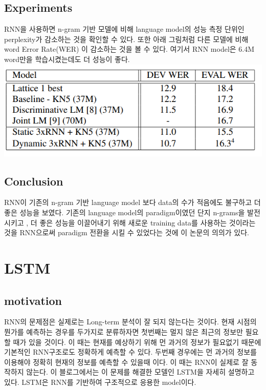 \documentclass[extendedabs]{bmvc2k}
\begin{document}
\subsection{Experiments}
\quad RNN을 사용하면 n-gram 기반 모델에 비해 language model의 성능 측정 단위인 perplexity가 감소하는 것을 확인할 수 있다. 
또한 아래 그림처럼 다른 모델에 비해 word Error Rate(WER) 이 감소하는 것을 볼 수 있다. 
여기서 RNN model은 6.4M word만을 학습시켰는데도 더 성능이 좋다.
\newline  \includegraphics[width=\linewidth]{images/03_language.PNG}

\subsection{Conclusion}
\quad RNN이 기존의 n-gram 기반 language model 보다 data의 수가 적음에도 불구하고 더 좋은 성능을 보였다. 기존의 language model의 
 paradigm이였던 단지 n-grams을 발전시키고 , 더 좋은 성능을 이끌어내기 위해 새로운 training data를 사용하는 것이라는 것을 
 RNN으로써 paradigm 전환을 시킬 수 있었다는 것에 이 논문의 의의가 있다.

\section{LSTM\cite{LSTM}}
 \subsection{motivation} 
 \quad RNN의 문제점은 실제로는 Long-term 분석이 잘 되지 않는다는 것이다. 
 현재 시점의 뭔가를 예측하는 경우를 두가지로 분류하자면 첫번째는 멀지 않은 최근의 정보만 필요할 때가 있을 것이다.
 이 때는 현재를 예상하기 위해 먼 과거의 정보가 필요없기 때문에 기본적인 RNN구조로도 정확하게 예측할 수 있다.
 두번째 경우에는 먼 과거의 정보를 이용해야 정확히 현재의 정보를 예측할 수 있을때 이다. 이 때는 RNN이 실제로 잘 동작하지 않는다.
 이 블로그에서는 이 문제를 해결한 모델인 LSTM을 자세히 설명하고 있다. LSTM은 RNN를 기반하여 구조적으로 응용한 model이다.
 
\end{document}
